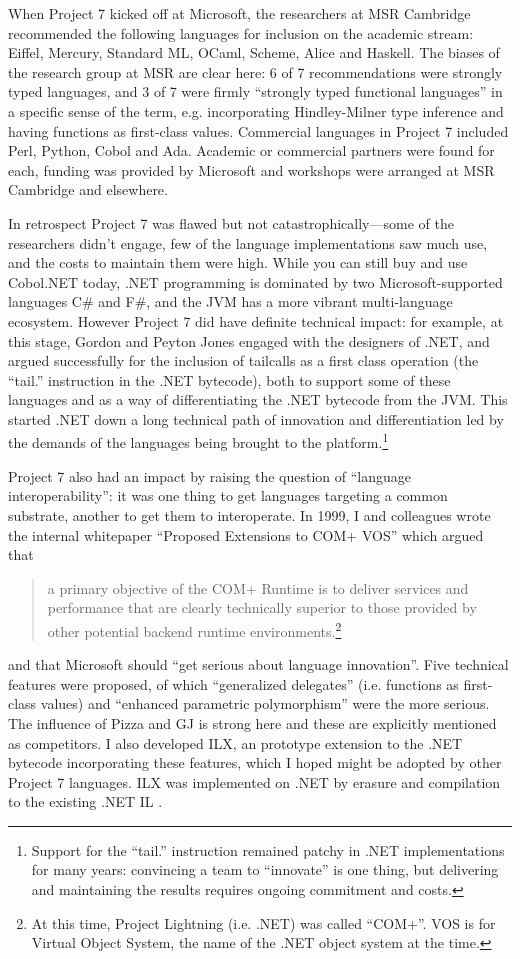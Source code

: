 \documentclass[acmsmall,screen]{acmart}
\begin{document}
When Project 7 kicked off at Microsoft, the researchers at MSR Cambridge recommended the following languages for inclusion on the academic
stream: Eiffel, Mercury, Standard ML, OCaml, Scheme, Alice and Haskell.  The biases of the research group at MSR are clear here: 6 of 7 recommendations
were strongly typed languages, and 3 of 7 were firmly “strongly typed functional languages” in a specific sense of the term, e.g. incorporating Hindley-Milner
type inference and having functions as first-class values. Commercial languages in Project 7 included Perl, Python, Cobol and Ada. Academic or commercial
partners were found for each, funding was provided by Microsoft and workshops were arranged at MSR Cambridge and elsewhere.

In retrospect Project 7 was flawed but not catastrophically---some of the researchers didn’t engage, few of the language implementations saw much use, and
the costs to maintain them were high. While you can still buy and use Cobol.NET today, .NET programming is dominated by two Microsoft-supported
languages C\# and F\#, and the JVM has a more vibrant multi-language ecosystem. However Project 7 did have definite technical impact: for example, at
this stage, Gordon and Peyton Jones engaged with the designers of .NET, and argued successfully for the inclusion of tailcalls as a first class
operation (the “tail.” instruction in the .NET bytecode), both to support some of these languages and as a way of differentiating the .NET bytecode from the JVM.  This
started .NET down a long technical path of innovation and differentiation led by the demands of the languages being brought to the
platform.\footnote{Support for the “tail.” instruction remained patchy in .NET implementations for many years: convincing a team to ``innovate'' is one
thing, but delivering and maintaining the results requires ongoing commitment and costs.}

Project 7 also had an impact by raising the question of “language interoperability”: it was one thing to get languages targeting a common
substrate, another to get them to interoperate.  In 1999, I and colleagues wrote the internal whitepaper “Proposed Extensions
to COM+ VOS” \citep{GenericHistory} which argued that 

\begin{quote}
a primary objective of the COM+ Runtime is to deliver services and performance that are clearly technically superior to those provided by other potential backend runtime environments.\footnote{At this time, Project Lightning (i.e. .NET) was called “COM+”.  VOS is for Virtual Object System, the name of the .NET object system at the time.} 
\end{quote}
and that Microsoft should “get serious about language innovation”.  Five technical features were proposed, of which “generalized
delegates” (i.e. functions as first-class values) and “enhanced parametric polymorphism” were the more serious.  The influence of Pizza and GJ is strong here
and these are explicitly mentioned as competitors. I also developed ILX, an prototype extension to the .NET bytecode incorporating these features, which I hoped
might be adopted by other Project 7 languages. ILX was implemented on .NET by erasure and compilation to the existing .NET IL \citep{Syme2001}.
\end{document}
